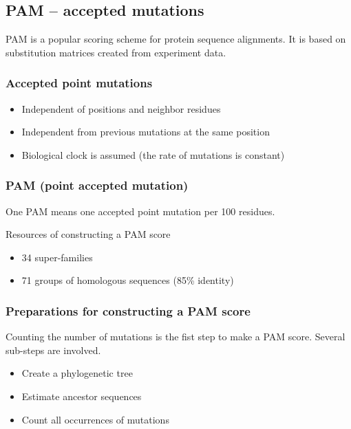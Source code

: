 %
%

%
%
\subsection{PAM – accepted mutations}
PAM is a popular scoring scheme for protein sequence alignments. It is based on substitution matrices created from experiment data.

%
%
\subsubsection*{Accepted point mutations}
\begin{itemize}
\item Independent of positions and neighbor residues
\item Independent from previous mutations at the same position
\item Biological clock is assumed (the rate of mutations is constant)
\end{itemize}

%
%
\subsubsection*{PAM (point accepted mutation)}
One PAM means one accepted point mutation per 100 residues. 

\noindent
Resources of constructing a PAM score
\begin{itemize}
\item 34 super-families
\item 71 groups of homologous sequences (85\% identity) 
\end{itemize}

%
%
\subsubsection*{Preparations for constructing a PAM score}
Counting the number of mutations is the fist step to make a PAM score. Several sub-steps are involved.

\begin{itemize}
\item Create a phylogenetic tree
\item Estimate ancestor sequences
\item Count all occurrences of mutations
\end{itemize}

